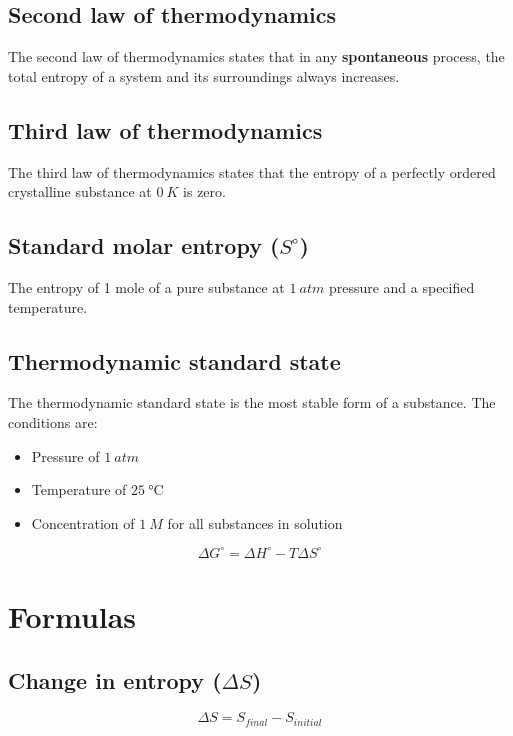 \documentclass[11pt]{article}
\begin{document}
\subsection{Second law of thermodynamics}
\label{sec:org387fc73}
The second law of thermodynamics states that in any \textbf{spontaneous} process, the total entropy of a system and its surroundings always increases.
\subsection{Third law of thermodynamics}
\label{sec:org78404b1}
The third law of thermodynamics states that the entropy of a perfectly ordered crystalline substance at \(\qty{0}{\unit{K}}\) is zero.
\subsection{Standard molar entropy (\(S^{\circ}\))}
\label{sec:orgb58f311}
The entropy of 1 mole of a pure substance at \(\qty{1}{\unit{atm}}\) pressure and a specified temperature.
\subsection{Thermodynamic standard state}
\label{sec:orgc7e5e81}
The thermodynamic standard state is the most stable form of a substance. The conditions are:
\begin{itemize}
\item Pressure of \(\qty{1}{\unit{atm}}\)
\item Temperature of \(\qty{25}{\unit{\degreeCelsius}}\)
\item Concentration of \(\qty{1}{\unit{M}}\) for all substances in solution
\end{itemize}

\[\Delta G^{\circ} = \Delta H^{\circ} - T \Delta S^{\circ}\]

\newpage
\section{Formulas}
\label{sec:org604cce5}

\subsection{Change in entropy (\(\Delta S\))}
\label{sec:org38dcc20}
\[\Delta S = S_{final} - S_{initial}\]
\end{document}
